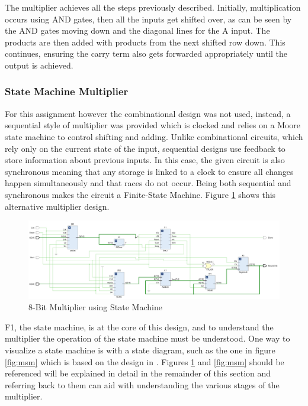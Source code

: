 \documentclass[11pt]{article}
\begin{document}
The multiplier achieves all the steps previously described.
Initially, multiplication occurs using AND gates, then all the inputs get shifted over, as can be seen by the AND gates moving down and the diagonal lines for the A input.
The products are then added with products from the next shifted row down.
This continues, ensuring the carry term also gets forwarded appropriately until the output is achieved.

\subsubsection{State Machine Multiplier}

For this assignment however the combinational design was not used, 
instead, a sequential style of multiplier was provided which is clocked and relies on a Moore state machine to control shifting and adding.
Unlike combinational circuits, which rely only on the current state of the input, sequential designs use feedback to store information about previous inputs\cite{dally}.
In this case, the given circuit is also synchronous meaning that any storage is linked to a clock to ensure all changes happen simultaneously and that races do not occur.
Being both sequential and synchronous makes the circuit a Finite-State Machine\cite{dally}.
Figure \ref{fig:4bit_mult} shows this alternative multiplier design. 

\begin{figure}[H]        
    \centering
    \includegraphics[width=\textwidth]{8bit.png}
    \caption{8-Bit Multiplier using State Machine}
    \label{fig:4bit_mult}
\end{figure} 

F1, the state machine, is at the core of this design, and to understand the multiplier the operation of the state machine must be understood.
One way to visualize a state machine is with a state diagram, such as the one in figure \ref{fig:msm} which is based on the design in \cite{smith1997application}.
Figures \ref{fig:4bit_mult} and \ref{fig:msm} should be referenced will be explained in detail in the remainder of this section and referring back to them can aid with understanding the various stages of the multiplier.
\end{document}
